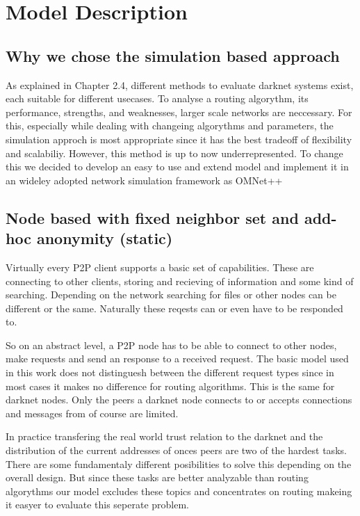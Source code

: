 \chapter{Model Description}

\section{Why we chose the simulation based approach}

As explained in Chapter 2.4, different methods to evaluate darknet systems exist, each suitable for different usecases. To analyse a routing algorythm, its performance, strengths, and weaknesses, larger scale networks are neccessary. For this, especially while dealing with changeing algorythms and parameters, the simulation approch is most appropriate since it has the best tradeoff of flexibility and scalabiliy. However, this method is up to now underrepresented. To change this we decided to develop an easy to use and extend model and implement it in an wideley adopted network simulation framework as OMNet++ 

\section{Node based with fixed neighbor set and add-hoc anonymity (static)}

Virtually every P2P client supports a basic set of capabilities. These are connecting to other clients, storing and recieving of information and some kind of searching. Depending on the network searching for files or other nodes can be different or the same. Naturally these reqests can or even have to be responded to.

So on an abstract level, a P2P node has to be able to connect to other nodes, make requests and send an response to a received request. The basic model used in this work does not distinguesh between the different request types since in most cases it makes no difference for routing algorithms. This is the same for darknet nodes. Only the peers a darknet node connects to or accepts connections and messages from of course are limited. 

In practice transfering the real world trust relation to the darknet and the distribution of the current addresses of onces peers are two of the hardest tasks. There are some fundamentaly different posibilities to solve this depending on the overall design. But since these tasks are better analyzable than routing algorythms our model excludes these topics and concentrates on routing makeing it easyer to evaluate this seperate problem.

